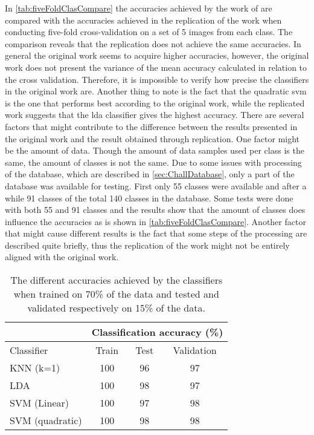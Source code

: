 In \autoref{tab:fiveFoldClasCompare} the accuracies achieved by the work of \cite{Khan2017a} are compared with the accuracies achieved in the replication of the work when conducting five-fold cross-validation on a set of 5 images from each class. The comparison reveals that the replication does not achieve the same accuracies. In general the original work seems to acquire higher accuracies, however, the original work does not present the variance of the mean accuracy calculated in relation to the cross validation. Therefore, it is impossible to verify how precise the classifiers in the original work are. Another thing to note is the fact that the quadratic \gls{svm} is the one that performs best according to the original work, while the replicated work suggests that the \gls{lda} classifier gives the highest accuracy. There are several factors that might contribute to the difference between the results presented in the original work and the result obtained through replication. One factor might be the amount of data. Though the amount of data samples used per class is the same, the amount of classes is not the same. Due to some issues with processing of the database, which are described in \autoref{sec:ChallDatabase}, only a part of the database was available for testing. First only 55 classes were available and after a while 91 classes of the total 140 classes in the database. Some tests were done with both 55 and 91 classes and the results show that the amount of classes does influence the accuracies as is shown in \autoref{tab:fiveFoldClasCompare}. Another factor that might cause different results is the fact that some steps of the processing are described quite briefly, thus the replication of the work might not be entirely aligned with the original work. 

\begin{table}[H]
\centering
\begin{tabular}{|l|c|c|c|}
\cline{2-4}
\multicolumn{1}{c|}{}&\multicolumn{3}{c|}{Classification accuracy (\%)}\\
\hline
Classifier&Train&Test&Validation\\
\hline
KNN (k=1)&100&96&97\\
\hline
LDA&100&98&97\\
\hline
SVM (Linear)&100&97&98\\
\hline
SVM (quadratic)&100&98&98\\
\hline
\end{tabular}
\caption{The different accuracies achieved by the classifiers when trained on 70\% of the data and tested and validated respectively on 15\% of the data.}
\label{tab:ClasAccMachine}
\end{table} 


